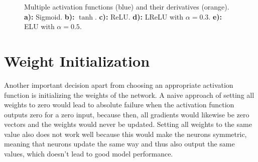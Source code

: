 \begin {figure}[!ht]
	\begin{center}
	\begin {subfigure}[b]{0.32\linewidth}
		\scalebox{0.65}{}
		\caption{}
	\end {subfigure}
	\begin {subfigure}[b]{0.32\linewidth}
		\scalebox{0.65}{}
		\caption{}
	\end {subfigure}
	\end{center}

	\begin {center}
	\begin {subfigure}[b]{0.32\linewidth}
		\scalebox{0.65}{}
		\caption{}
	\end {subfigure}
	\begin {subfigure}[b]{0.32\linewidth}
		\scalebox{0.65}{}
		\caption{}
	\end {subfigure}
	\begin {subfigure}[b]{0.32\linewidth}
		\scalebox{0.65}{}
		\caption{}
	\end {subfigure}
	\end{center}

		\caption[Multiple activation functions.]{Multiple activation functions (blue) and their derivatives (orange). \textbf{a):} Sigmoid. \textbf{b):} $\tanh$. \textbf{c):} ReLU. \textbf{d):} LReLU with $\alpha = 0.3$. \textbf{e):} ELU with $\alpha = 0.5$.}
		\label{fig:activation_functions}

\end {figure}



	\section{Weight Initialization}
\label{sec:weight_init}
Another important decision apart from choosing an appropriate activation function is initializing the weights of the network. A naive approach of setting all weights to zero would lead to absolute failure when the activation function outputs zero for a zero input, because then, all gradients would likewise be zero vectors and the weights would never be updated. Setting all weights to the same value also does not work well because this would make the neurons symmetric, meaning that neurons update the same way and thus also output the same values, which doesn't lead to good model performance.

